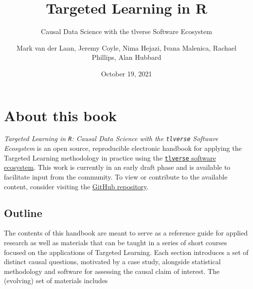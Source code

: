 \documentclass[
  12pt, krantz2,
]{krantz}
\title{Targeted Learning in R}
\subtitle{Causal Data Science with the tlverse Software Ecosystem}
\author{Mark van der Laan, Jeremy Coyle, Nima Hejazi, Ivana Malenica, Rachael Phillips, Alan Hubbard}
\date{October 19, 2021}
\newcommand{\passthrough}[1]{#1}
\theoremstyle{definition}
\theoremstyle{definition}
\theoremstyle{definition}
\newcommand{\1}{\mathbbm{1}}
\begin{document}
\maketitle


\thispagestyle{empty}

\begin{center}
\end{center}

\setlength{\abovedisplayskip}{-5pt}
\setlength{\abovedisplayshortskip}{-5pt}

\mainmatter

{
\hypersetup{linkcolor=}
\setcounter{tocdepth}{2}
\tableofcontents
}
\listoftables
\listoffigures
\hypertarget{about-this-book}{%
\chapter*{About this book}\label{about-this-book}}


\emph{Targeted Learning in \passthrough{\lstinline!R!}: Causal Data Science with the \passthrough{\lstinline!tlverse!} Software
Ecosystem} is an open source, reproducible electronic handbook for applying the
Targeted Learning methodology in practice using the \href{https://github.com/tlverse}{\passthrough{\lstinline!tlverse!} software
ecosystem}. This work is currently in an early draft
phase and is available to facilitate input from the community. To view or
contribute to the available content, consider visiting the \href{https://github.com/tlverse/tlverse-handbook}{GitHub
repository}.

\hypertarget{outline}{%
\section{Outline}\label{outline}}

The contents of this handbook are meant to serve as a reference guide for
applied research as well as materials that can be taught in a series of short
courses focused on the applications of Targeted Learning. Each section
introduces a set of distinct causal questions, motivated by a case study,
alongside statistical methodology and software for assessing the causal claim of
interest. The (evolving) set of materials includes
\end{document}
